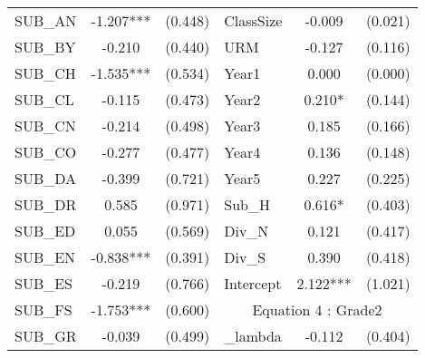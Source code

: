 \begin{table}[htb]
\begin{threeparttable}
\begin{tabular}{l c c|l c c}
    SUB\_AN                                      & -1.207***                 & (0.448)              & ClassSize           & -0.009                 & (0.021)              \\
    SUB\_BY                                      & -0.210                    & (0.440)              & URM                 & -0.127                 & (0.116)              \\
    SUB\_CH                                      & -1.535***                 & (0.534)              & Year1               & 0.000                  & (0.000)              \\
    SUB\_CL                                      & -0.115                    & (0.473)              & Year2               & 0.210*                 & (0.144)              \\
    SUB\_CN                                      & -0.214                    & (0.498)              & Year3               & 0.185                  & (0.166)              \\
    SUB\_CO                                      & -0.277                    & (0.477)              & Year4               & 0.136                  & (0.148)              \\
    SUB\_DA                                      & -0.399                    & (0.721)              & Year5               & 0.227                  & (0.225)              \\
    SUB\_DR                                      & 0.585                     & (0.971)              & Sub\_H              & 0.616*                 & (0.403)              \\
    SUB\_ED                                      & 0.055                     & (0.569)              & Div\_N              & 0.121                  & (0.417)              \\
    SUB\_EN                                      & -0.838***                 & (0.391)              & Div\_S              & 0.390                  & (0.418)              \\
    SUB\_ES                                      & -0.219                    & (0.766)              & Intercept           & 2.122***               & (1.021)              \\
    \cline{4-6}
    SUB\_FS                                      & -1.753***                 & (0.600)              & \multicolumn{3}{c}{Equation 4 : Grade2}                             \\
    \cline{4-6}
    SUB\_GR                                      & -0.039                    & (0.499)              & \_lambda            & -0.112                 & (0.404)              \\

\end{tabular}
\end{threeparttable}
\end{table}
